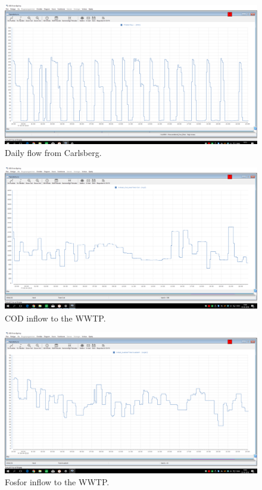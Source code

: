 \begin{figure}[H]
	\centering
	\includegraphics[width=0.95\textheight, angle=-90]{report/appendix/figures/Carlsberg_data.png}
	\caption{Daily flow from Carlsberg.}
	\label{fig:Carlsberg_data}
\end{figure}

\begin{figure}[H]
	\centering
	\includegraphics[width=0.95\textheight, angle=-90]{report/appendix/figures/COD_data.png}
	\caption{COD inflow to the WWTP.}
	\label{fig:COD_data}
\end{figure}

\begin{figure}[H]
	\centering
	\includegraphics[width=0.95\textheight, angle=-90]{report/appendix/figures/Forfos_data.png}
	\caption{Fosfor inflow to the WWTP.}
	\label{fig:Forfos_data}
\end{figure}


